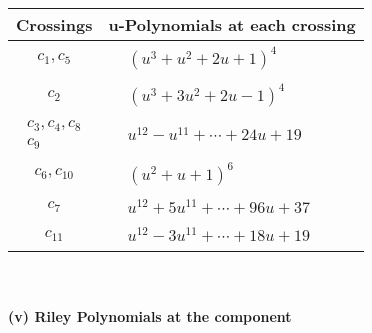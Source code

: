 \documentclass[1p]{elsarticle_modified}
\theoremstyle{definition}
\begin{document}
\begin{tabular}{m{50pt}|m{274pt}}
Crossings & \hspace{64pt}u-Polynomials at each crossing \\
\hline $$\begin{aligned}c_{1},c_{5}\end{aligned}$$&$\begin{aligned}
&(u^3+u^2+2 u+1)^4
\end{aligned}$\\
\hline $$\begin{aligned}c_{2}\end{aligned}$$&$\begin{aligned}
&(u^3+3 u^2+2 u-1)^4
\end{aligned}$\\
\hline $$\begin{aligned}c_{3},c_{4},c_{8}\\c_{9}\end{aligned}$$&$\begin{aligned}
&u^{12}- u^{11}+\cdots+24 u+19
\end{aligned}$\\
\hline $$\begin{aligned}c_{6},c_{10}\end{aligned}$$&$\begin{aligned}
&(u^2+u+1)^6
\end{aligned}$\\
\hline $$\begin{aligned}c_{7}\end{aligned}$$&$\begin{aligned}
&u^{12}+5 u^{11}+\cdots+96 u+37
\end{aligned}$\\
\hline $$\begin{aligned}c_{11}\end{aligned}$$&$\begin{aligned}
&u^{12}-3 u^{11}+\cdots+18 u+19
\end{aligned}$\\
\hline
\end{tabular}\\~\\
\newpage\renewcommand{\arraystretch}{1}
\flushleft \textbf{(v) Riley Polynomials at the component}\newline \\
\end{document}

